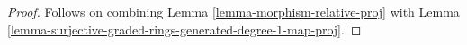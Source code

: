 \begin{proof}
Follows on combining
Lemma \ref{lemma-morphism-relative-proj}
with
Lemma \ref{lemma-surjective-graded-rings-generated-degree-1-map-proj}.
\end{proof}


















